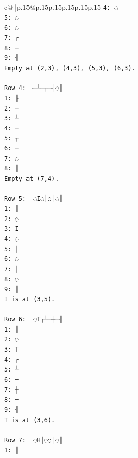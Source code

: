 \documentclass{article}
\begin{document}
{\begin{supertabular}{c@{$\;$}|p{.15\linewidth}@{}p{.15\linewidth}p{.15\linewidth}p{.15\linewidth}p{.15\linewidth}p{.15\linewidth}}
{{{\texttt{4: ◌} \\
\texttt{5: ◌} \\
\texttt{6: ◌} \\
\texttt{7: ┌} \\
\texttt{8: ─} \\
\texttt{9: ╢} \\
\texttt{Empty at (2,3), (4,3), (5,3), (6,3).} \\
\\ 
\texttt{Row 4: ╟─┴─┬─┤◌║} \\
\texttt{1: ╟} \\
\texttt{2: ─} \\
\texttt{3: ┴} \\
\texttt{4: ─} \\
\texttt{5: ┬} \\
\texttt{6: ─} \\
\texttt{7: ◌} \\
\texttt{8: ║} \\
\texttt{Empty at (7,4).} \\
\\ 
\texttt{Row 5: ║◌I◌│◌│◌║} \\
\texttt{1: ║} \\
\texttt{2: ◌} \\
\texttt{3: I} \\
\texttt{4: ◌} \\
\texttt{5: │} \\
\texttt{6: ◌} \\
\texttt{7: │} \\
\texttt{8: ◌} \\
\texttt{9: ║} \\
\texttt{I is at (3,5).} \\
\\ 
\texttt{Row 6: ║◌T┌┴─┼─╢} \\
\texttt{1: ║} \\
\texttt{2: ◌} \\
\texttt{3: T} \\
\texttt{4: ┌} \\
\texttt{5: ┴} \\
\texttt{6: ─} \\
\texttt{7: ┼} \\
\texttt{8: ─} \\
\texttt{9: ╢} \\
\texttt{T is at (3,6).} \\
\\ 
\texttt{Row 7: ║◌H│◌◌│◌║} \\
\texttt{1: ║} \\
}}}
\end{supertabular}}
\end{document}
